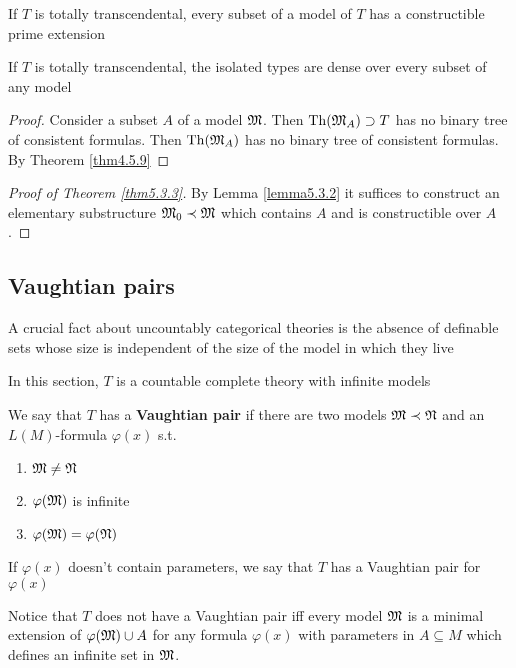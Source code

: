 \documentclass[11pt]{article}
\begin{document}
\begin{theorem}[]
\label{thm5.3.3}
If \(T\) is totally transcendental, every subset of a model of \(T\) has a constructible prime extension
\end{theorem}

\begin{lemma}[]
If \(T\) is totally transcendental, the isolated types are dense over every subset of any model
\end{lemma}

\begin{proof}
Consider a subset \(A\) of a model \(\mathfrak{M}\). Then \(\operatorname{Th}(\mathfrak{M}_A)\supset T\) has no binary tree of consistent
formulas. Then \(\operatorname{Th}(\mathfrak{M}_A)\) has no binary tree of consistent formulas. By Theorem \ref{thm4.5.9}
\end{proof}

\begin{proof}[Proof of Theorem \ref{thm5.3.3}]
By Lemma \ref{lemma5.3.2} it suffices to construct an elementary substructure \(\mathfrak{M}_0\prec\mathfrak{M}\) which
contains \(A\) and is constructible over \(A\).
\end{proof}

\subsection{Vaughtian pairs}
\label{sec:orgcea56e9}
A crucial fact about uncountably categorical theories is the absence of definable sets whose
size is independent of the size of the model in which they live

In this section, \(T\) is a countable complete theory with infinite models

\begin{definition}[]
We say that \(T\) has a \textbf{Vaughtian pair} if there are two models \(\mathfrak{M}\prec\mathfrak{N}\) and
an \(L(M)\)-formula \(\varphi(x)\) s.t.
\begin{enumerate}
\item \(\mathfrak{M}\neq\mathfrak{N}\)
\item \(\varphi(\mathfrak{M})\) is infinite
\item \(\varphi(\mathfrak{M})=\varphi(\mathfrak{N})\)
\end{enumerate}


If \(\varphi(x)\) doesn't contain parameters, we say that \(T\) has a Vaughtian pair for \(\varphi(x)\)
\end{definition}

\begin{remark}
Notice that \(T\) does not have a Vaughtian pair iff every model \(\mathfrak{M}\) is a minimal extension
of \(\varphi(\mathfrak{M})\cup A\) for any formula \(\varphi(x)\) with parameters in \(A\subseteq M\) which defines an infinite
set in \(\mathfrak{M}\).
\end{remark}
\end{document}
